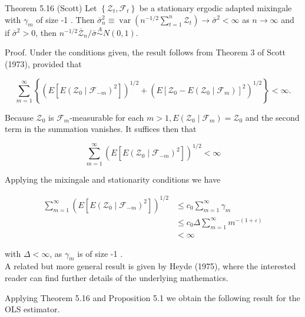 \documentclass[10pt]{article}
\begin{document}
Theorem 5.16 (Scott) Let $\left\{\mathcal{Z}_{t}, \mathcal{F}_{t}\right\}$ be a stationary ergodic adapted mixingale with $\gamma_{m}$ of size -1 . Then $\bar{\sigma}_{n}^{2} \equiv \operatorname{var}\left(n^{-1 / 2} \sum_{t=1}^{n} \mathcal{Z}_{t}\right) \rightarrow \bar{\sigma}^{2}<\infty$ as $n \rightarrow \infty$ and if $\bar{\sigma}^{2}>0$, then $n^{-1 / 2} \overline{\mathcal{Z}}_{n} / \bar{\sigma} \stackrel{A}{\sim} N(0,1)$.

Proof. Under the conditions given, the result follows from Theorem 3 of Scott (1973), provided that

$$
\sum_{m=1}^{\infty}\left\{\left(E\left[E\left(\mathcal{Z}_{0} \mid \mathcal{F}_{-m}\right)^{2}\right]\right)^{1 / 2}+\left(E\left[\mathcal{Z}_{0}-E\left(\mathcal{Z}_{0} \mid \mathcal{F}_{m}\right)\right]^{2}\right)^{1 / 2}\right\}<\infty .
$$

Because $\mathcal{Z}_{0}$ is $\mathcal{F}_{m}$-measurable for each $m>1, E\left(\mathcal{Z}_{0} \mid \mathcal{F}_{m}\right)=\mathcal{Z}_{0}$ and the second term in the summation vanishes. It suffices then that

$$
\sum_{m=1}^{\infty}\left(E\left[E\left(\mathcal{Z}_{0} \mid \mathcal{F}_{-m}\right)^{2}\right]\right)^{1 / 2}<\infty
$$

Applying the mixingale and stationarity conditions we have

$$
\begin{aligned}
\sum_{m=1}^{\infty}\left(E\left[E\left(\mathcal{Z}_{0} \mid \mathcal{F}_{-m}\right)^{2}\right]\right)^{1 / 2} & \leq c_{0} \sum_{m=1}^{\infty} \gamma_{m} \\
& \leq c_{0} \Delta \sum_{m=1}^{\infty} m^{-(1+\varepsilon)} \\
& <\infty
\end{aligned}
$$

with $\Delta<\infty$, as $\gamma_{m}$ is of size -1 .\\
A related but more general result is given by Heyde (1975), where the interested reader can find further details of the underlying mathematics.

Applying Theorem 5.16 and Proposition 5.1 we obtain the following result for the OLS estimator.
\end{document}
